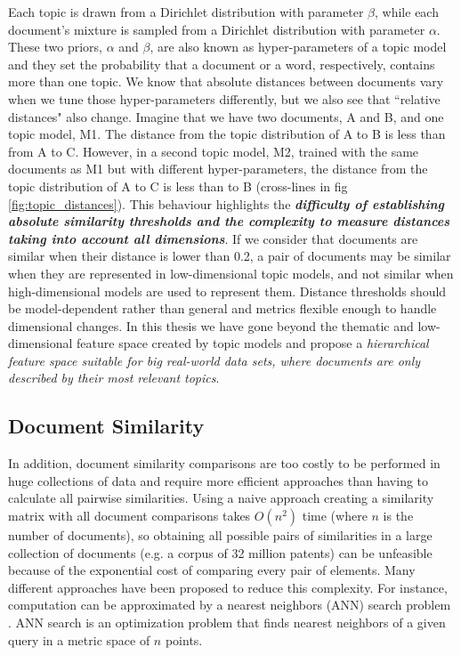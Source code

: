 Each topic is drawn from a Dirichlet distribution with parameter $\beta$, while each document's mixture is sampled from a Dirichlet distribution with parameter $\alpha$. These two priors, $\alpha$ and $\beta$, are also known as hyper-parameters of a topic model and they set the probability that a document or a word, respectively, contains more than one topic. We know that absolute distances between documents vary when we tune those hyper-parameters differently, but we also see that ``relative distances" also change. Imagine that we have two documents, A and B, and one topic model, M1. The distance from the topic distribution of A to B is less than from A to C. However, in a second topic model, M2, trained with the same documents as M1 but with different hyper-parameters, the distance from the topic distribution of A to C is less than to B (cross-lines in fig \ref{fig:topic_distances}). This behaviour highlights the \textbf{\textit{difficulty of establishing absolute similarity thresholds and the complexity to measure distances taking into account all dimensions}}. If we consider that documents are similar when their distance is lower than 0.2, a pair of documents may be similar when they are represented in low-dimensional topic models, and not similar when high-dimensional models are used to represent them. Distance thresholds should be model-dependent rather than general and metrics flexible enough to handle dimensional changes. In this thesis we have gone beyond the thematic and low-dimensional feature space created by topic models and propose a \textit{ hierarchical feature space suitable for big real-world data sets, where documents are only described by their most relevant topics}.


\subsection{Document Similarity}
\label{sec:document-similarity}

In addition, document similarity comparisons are too costly to be performed in huge collections of data and require more efficient approaches than having to calculate all pairwise similarities. Using a naive approach creating a similarity matrix with all document comparisons takes $O(n^2)$ time (where $n$ is the number of documents), so obtaining all possible pairs of similarities in a large collection of documents (e.g. a corpus of 32 million patents) can be unfeasible because of the exponential cost of comparing every pair of elements. Many different approaches have been proposed to reduce this complexity. For instance, computation can be approximated by a nearest neighbors (ANN) search problem \citep{Indyk1998}. ANN search is an optimization problem that finds nearest neighbors of a given query in a metric space of $n$ points. 

